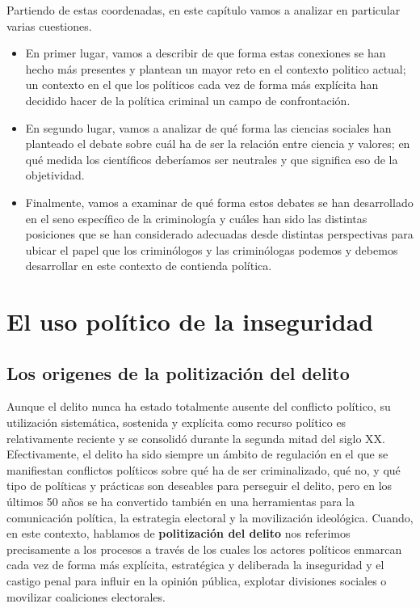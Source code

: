 \documentclass[
  spanish,
  letterpaper,
  DIV=11,
  numbers=noendperiod]{scrreprt}
\begin{document}
Partiendo de estas coordenadas, en este capítulo vamos a analizar en
particular varias cuestiones.

\begin{itemize}
\item
  En primer lugar, vamos a describir de que forma estas conexiones se
  han hecho más presentes y plantean un mayor reto en el contexto
  politico actual; un contexto en el que los políticos cada vez de forma
  más explícita han decidido hacer de la política criminal un campo de
  confrontación.
\item
  En segundo lugar, vamos a analizar de qué forma las ciencias sociales
  han planteado el debate sobre cuál ha de ser la relación entre ciencia
  y valores; en qué medida los científicos deberíamos ser neutrales y
  que significa eso de la objetividad.
\item
  Finalmente, vamos a examinar de qué forma estos debates se han
  desarrollado en el seno específico de la criminología y cuáles han
  sido las distintas posiciones que se han considerado adecuadas desde
  distintas perspectivas para ubicar el papel que los criminólogos y las
  criminólogas podemos y debemos desarrollar en este contexto de
  contienda política.
\end{itemize}

\section{El uso político de la
inseguridad}\label{el-uso-poluxedtico-de-la-inseguridad}

\subsection{Los origenes de la politización del
delito}\label{los-origenes-de-la-politizaciuxf3n-del-delito}

Aunque el delito nunca ha estado totalmente ausente del conflicto
político, su utilización sistemática, sostenida y explícita como recurso
político es relativamente reciente y se consolidó durante la segunda
mitad del siglo XX. Efectivamente, el delito ha sido siempre un ámbito
de regulación en el que se manifiestan conflictos políticos sobre qué ha
de ser criminalizado, qué no, y qué tipo de políticas y prácticas son
deseables para perseguir el delito, pero en los últimos 50 años se ha
convertido también en una herramientas para la comunicación política, la
estrategia electoral y la movilización ideológica. Cuando, en este
contexto, hablamos de \textbf{politización del delito} nos referimos
precisamente a los procesos a través de los cuales los actores políticos
enmarcan cada vez de forma más explícita, estratégica y deliberada la
inseguridad y el castigo penal para influir en la opinión pública,
explotar divisiones sociales o movilizar coaliciones electorales.
\end{document}
